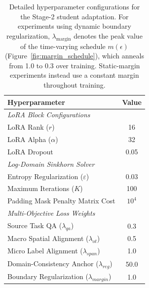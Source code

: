 \documentclass[11pt]{article}
\begin{document}
\begin{table}[t]
\centering
\small
\begin{tabular}{lc}
\toprule
\textbf{Hyperparameter} & \textbf{Value} \\
\midrule
\multicolumn{2}{l}{\textit{LoRA Block Configurations}} \\
LoRA Rank ($r$) & 16 \\
LoRA Alpha ($\alpha$) & 32 \\
LoRA Dropout & 0.05 \\
\midrule
\multicolumn{2}{l}{\textit{Log-Domain Sinkhorn Solver}} \\
Entropy Regularization ($\varepsilon$) & 0.03 \\
Maximum Iterations ($K$) & 100 \\
Padding Mask Penalty Matrix Cost & $10^4$ \\
\midrule
\multicolumn{2}{l}{\textit{Multi-Objective Loss Weights}} \\
Source Task QA ($\lambda_{qa}$) & 0.3 \\
Macro Spatial Alignment ($\lambda_{ot}$) & 0.5 \\
Micro Label Alignment ($\lambda_{span}$) & 1.0 \\
Domain-Consistency Anchor ($\lambda_{reg}$) & 50.0 \\
Boundary Regularization ($\lambda_{margin}$) & 1.0 \\
\bottomrule
\end{tabular}
\caption{Detailed hyperparameter configurations for the Stage-2 student adaptation. For experiments using dynamic boundary regularization,
$\lambda_{\text{margin}}$ denotes the peak value of the time-varying schedule
$m(\epsilon)$ (Figure~\ref{fig:margin_schedule}), which anneals from 1.0 to
0.3 over training. Static-margin experiments instead use a constant margin
throughout training.}
\label{tab:hyperparameters}
\end{table}
\end{document}
